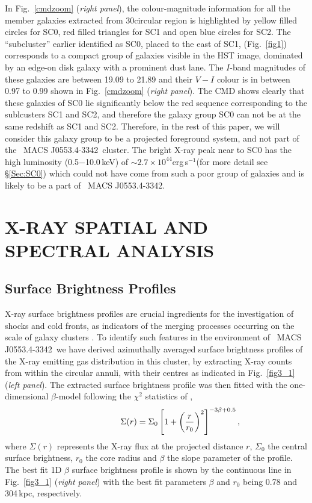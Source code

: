 \documentclass[useASM,usenatbib]{mn2e}
\newcommand{\lum}{erg\,s$^{-1}$}
\newcommand{\mac}{\rm~MACS J0553.4-3342}
\begin{document}
In Fig.~\ref{cmdzoom} ({\it right panel}), the colour-magnitude information for all the member galaxies extracted from 30\arcsec circular region is highlighted by yellow filled circles for SC0,
 red filled triangles for SC1 and open blue circles for SC2.  The ``subcluster'' 
 earlier identified as SC0,  placed to the east of SC1, (Fig.~\ref{fig1}) corresponds to
a compact group of galaxies visible in the HST image, dominated by an edge-on
disk galaxy with a prominent dust lane.  The $I$-band magnitudes of
these galaxies are between 19.09 to 21.89 and  their $V-I$ colour is in between 0.97 to 0.99 shown in Fig.~\ref{cmdzoom} ({\it right panel}).  The CMD shows clearly that these galaxies of SC0 lie significantly below the red sequence corresponding to the sublcusters SC1 and SC2, and therefore the galaxy group SC0 can not be at the same redshift as SC1 and SC2. Therefore, in the rest of this paper, we will consider this galaxy group to be a  projected foreground system, and  not part of the \mac~cluster. The bright X-ray peak near to SC0 has the high luminosity (0.5$-$10.0\,keV) of  $\sim 2.7\times10^{44}$\lum (for more detail see \S\ref{Sec:SC0}) which could not have come from such a poor group of galaxies and is likely to be a part of \mac.

\section{X-RAY SPATIAL AND SPECTRAL ANALYSIS}

\subsection{Surface Brightness Profiles}
X-ray surface brightness profiles are crucial ingredients for the investigation
of shocks and cold fronts, as indicators of the merging processes
occurring on the scale of galaxy clusters
\citep{2015ApJ...812..153O,2016MNRAS.458..681D,2016MNRAS.460L..84B}.
To identify such features in the environment of \mac\ we have derived
azimuthally averaged surface brightness profiles of the X-ray emitting
gas distribution in this cluster, by extracting X-ray counts from
within the circular annuli, with their centres as indicated in
Fig.~\ref{fig3_1} ({\it left panel}). The extracted surface brightness
profile was then fitted with the one-dimensional $\beta$-model
following the $\chi^2$ statistics of \cite{1986ApJ...303..336G}, 
\begin{equation}
 \hspace{20mm} \Sigma(r)=\Sigma_0\left[ 1+\left( \frac{r}{r_0} \right)^2\right] ^{-3\beta+0.5},
\end{equation}
where $\Sigma(r)$ represents the X-ray flux at the projected distance
$r$, $\Sigma_0$ the central surface brightness, $r_0$ the core radius
and $\beta$ the slope parameter of the profile. The best fit 1D
$\beta$ surface brightness profile is shown by the continuous line in
Fig.~\ref{fig3_1} ({\it right panel}) with the best fit parameters
$\beta$ and $r_{0}$ being 0.78 and 304\,kpc, respectively.
\end{document}
